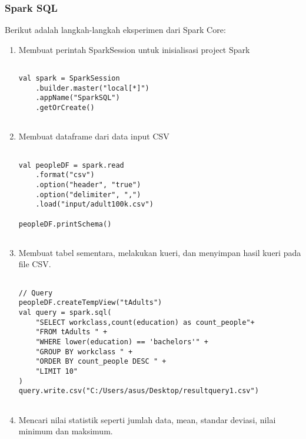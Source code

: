 \subsubsection{Spark SQL}
\noindent Berikut adalah langkah-langkah eksperimen dari Spark Core:
\begin{enumerate}

\item Membuat perintah SparkSession untuk inisialisasi project Spark
\begin{lstlisting}[basicstyle=\ttfamily, frame=single,
	columns=fullflexible, keepspaces=true, breaklines=true, label=ls_kepatuhan_1_1_1_logo_sharif_judge, caption=Main method]
	
val spark = SparkSession
	.builder.master("local[*]")
	.appName("SparkSQL")
	.getOrCreate()	
	
\end{lstlisting}

\newpage
\item Membuat dataframe dari data input CSV
\begin{lstlisting}[basicstyle=\ttfamily, frame=single,
	columns=fullflexible, keepspaces=true, breaklines=true, label=ls_kepatuhan_1_1_1_logo_sharif_judge, caption=Main method]
	
val peopleDF = spark.read
	.format("csv")
	.option("header", "true")
	.option("delimiter", ",")
	.load("input/adult100k.csv")

peopleDF.printSchema()	
	
\end{lstlisting}

\item Membuat tabel sementara, melakukan kueri, dan menyimpan hasil kueri pada file CSV.
\begin{lstlisting}[basicstyle=\ttfamily, frame=single,
	columns=fullflexible, keepspaces=true, breaklines=true, label=ls_kepatuhan_1_1_1_logo_sharif_judge, caption=Main method]
	
// Query
peopleDF.createTempView("tAdults")
val query = spark.sql(
	"SELECT workclass,count(education) as count_people"+
	"FROM tAdults " +
	"WHERE lower(education) == 'bachelors'" +
	"GROUP BY workclass " +
	"ORDER BY count_people DESC " +
	"LIMIT 10"
)	
query.write.csv("C:/Users/asus/Desktop/resultquery1.csv")
	
\end{lstlisting}

\item Mencari nilai statistik seperti jumlah data, mean, standar deviasi, nilai minimum dan maksimum.
\begin{lstlisting}[basicstyle=\ttfamily, frame=single,
	columns=fullflexible, keepspaces=true, breaklines=true, label=ls_kepatuhan_1_1_1_logo_sharif_judge, caption=Main method]
	

\end{lstlisting}
\end{enumerate}

